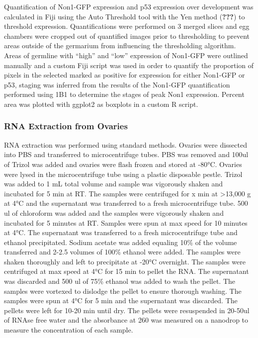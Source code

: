 \documentclass[12pt,oneside]{reedthesis}
\begin{document}
Quantification of Non1-GFP expression and p53 expression over development was calculated in Fiji using the Auto Threshold tool with the Yen method ({\textbf{???}}) to threshold expression. Quantifications were performed on 3 merged slices and egg chambers were cropped out of quantified images prior to thresholding to prevent areas outside of the germarium from influencing the thresholding algorithm. Areas of germline with ``high'' and ``low'' expression of Non1-GFP were outlined manually and a custom Fiji script was used in order to quantify the proportion of pixels in the selected marked as positive for expression for either Non1-GFP or p53, staging was inferred from the results of the Non1-GFP quantification performed using 1B1 to determine the stages of peak Non1 expression. Percent area was plotted with ggplot2 as boxplots in a custom R script.

\hypertarget{rna-extraction-from-ovaries}{%
\subsubsection{RNA Extraction from Ovaries}\label{rna-extraction-from-ovaries}}

RNA extraction was performed using standard methods. Ovaries were dissected into PBS and transferred to microcentrifuge tubes. PBS was removed and 100ul of Trizol was added and ovaries were flash frozen and stored at -80°C. Ovaries were lysed in the microcentrifuge tube using a plastic disposable pestle. Trizol was added to 1 mL total volume and sample was vigorously shaken and incubated for 5 min at RT. The samples were centrifuged for x min at \textgreater13,000 g at 4°C and the supernatant was transferred to a fresh microcentrifuge tube. 500 ul of chloroform was added and the samples were vigorously shaken and incubated for 5 minutes at RT. Samples were spun at max speed for 10 minutes at 4°C. The supernatant was transferred to a fresh microcentrifuge tube and ethanol precipitated. Sodium acetate was added equaling 10\% of the volume transferred and 2-2.5 volumes of 100\% ethanol were added. The samples were shaken thoroughly and left to precipitate at -20°C overnight. The samples were centrifuged at max speed at 4°C for 15 min to pellet the RNA. The supernatant was discarded and 500 ul of 75\% ethanol was added to wash the pellet. The samples were vortexed to dislodge the pellet to ensure thorough washing. The samples were spun at 4°C for 5 min and the supernatant was discarded. The pellets were left for 10-20 min until dry. The pellets were resuspended in 20-50ul of RNAse free water and the absorbance at 260 was measured on a nanodrop to measure the concentration of each sample.
\end{document}
